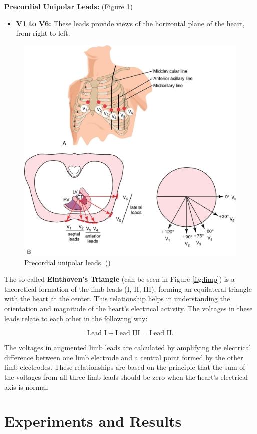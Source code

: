 \documentclass{mldsmsc}
\begin{document}
\noindent \textbf{Precordial Unipolar Leads:} (Figure \ref{fig:vs})
\begin{itemize}
    \item \textbf{V1 to V6:} These leads provide views of the horizontal plane of the heart, from right to left.
\end{itemize}

\begin{figure}[H]
\centering
\includegraphics[width=0.5\linewidth]{images/vs.jpg}
\caption{Precordial unipolar leads. (\cite{huszar})}
\label{fig:vs}
\end{figure}

\noindent The so called  \textbf{Einthoven's Triangle} (can be seen in Figure \ref{fig:limp}) is a theoretical formation of the limb leads (I, II, III), forming an equilateral triangle with the heart at the center. This relationship helps in understanding the orientation and magnitude of the heart's electrical activity. The voltages in these leads relate to each other in the following way:

\begin{equation}
    \text{Lead I} + \text{Lead III} = \text{Lead II}.
\end{equation}

\noindent The voltages in augmented limb leads are calculated by amplifying the electrical difference between one limb electrode and a central point formed by the other limb electrodes. These relationships are based on the principle that the sum of the voltages from all three limb leads should be zero when the heart's electrical axis is normal.

\clearpage

\chapter{Experiments and Results}
\end{document}
